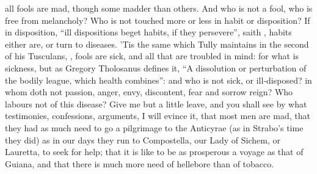 all fools are mad, though some madder than others. And who
is not a fool, who is free from melancholy? Who is not touched more or less in
habit or disposition? If in disposition, \enquote{ill dispositions beget habits, if
they persevere}, saith , habits either
are, or turn to diseases. 'Tis the same which Tully maintains in the second of
his Tusculans, ,
fools are sick, and all that are troubled in mind: for what is sickness, but as
Gregory Tholosanus defines it, \enquote{A dissolution or
perturbation of the bodily league, which health combines}: and who is not sick,
or ill-disposed? in whom doth not passion, anger, envy, discontent, fear and
sorrow reign? Who labours not of this disease? Give me but a little leave, and
you shall see by what testimonies, confessions, arguments, I will evince it,
that most men are mad, that they had as much need to go a pilgrimage to the
Anticyrae (as in Strabo's time they did) as in our days
they run to Compostella, our Lady of Sichem, or Lauretta, to seek for help;
that it is like to be as prosperous a voyage as that of Guiana, and that there
is much more need of hellebore than of tobacco.

